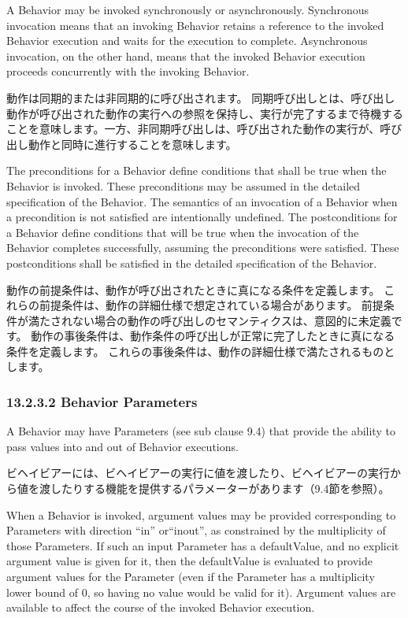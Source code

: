 \documentclass[a4paper,11pt]{ltjsarticle}
\begin{document}
A Behavior may be invoked synchronously or asynchronously. 
Synchronous invocation means that an invoking Behavior retains a reference to the invoked Behavior execution and waits for the execution to complete. Asynchronous invocation, on the other hand, means that the invoked Behavior execution proceeds concurrently with the invoking Behavior.

動作は同期的または非同期的に呼び出されます。
同期呼び出しとは、呼び出し動作が呼び出された動作の実行への参照を保持し、実行が完了するまで待機することを意味します。一方、非同期呼び出しは、呼び出された動作の実行が、呼び出し動作と同時に進行することを意味します。

The preconditions for a Behavior define conditions that shall be true when the Behavior is invoked. 
These preconditions may be assumed in the detailed specification of the Behavior. 
The semantics of an invocation of a Behavior when a precondition is not satisfied are intentionally undefined.
The postconditions for a Behavior define conditions that will be true when the invocation of the Behavior completes successfully, assuming the preconditions were satisfied. 
These postconditions shall be satisfied in the detailed specification of the Behavior.


動作の前提条件は、動作が呼び出されたときに真になる条件を定義します。
これらの前提条件は、動作の詳細仕様で想定されている場合があります。
前提条件が満たされない場合の動作の呼び出しのセマンティクスは、意図的に未定義です。
動作の事後条件は、動作条件の呼び出しが正常に完了したときに真になる条件を定義します。
これらの事後条件は、動作の詳細仕様で満たされるものとします。


\subsubsection*{13.2.3.2 Behavior Parameters}

A Behavior may have Parameters (see sub clause 9.4) that provide the ability to pass values into and out of Behavior executions.

ビヘイビアーには、ビヘイビアーの実行に値を渡したり、ビヘイビアーの実行から値を渡したりする機能を提供するパラメーターがあります（9.4節を参照）。

When a Behavior is invoked, argument values may be provided corresponding to Parameters with direction “in” or“inout”, as constrained by the multiplicity of those Parameters. 
If such an input Parameter has a defaultValue, and no explicit argument value is given for it, then the defaultValue is evaluated to provide argument values for the Parameter (even if the Parameter has a multiplicity lower bound of 0, so having no value would be valid for it). Argument values are available to affect the course of the invoked Behavior execution.
\end{document}
